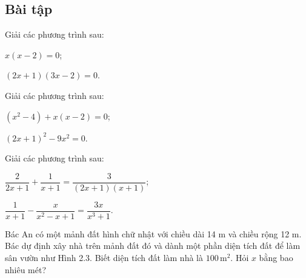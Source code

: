 \begin{exercises}
    \subsection{Bài tập}

    \begin{questions}[series=SGK]
        \item Giải các phương trình sau:
        \begin{questions}
            \item $x(x-2)=0$;

            \answerline
            \answerline
            \item $(2x+1)(3x-2)=0$.

            \answerline
            \answerline
        \end{questions}

        \item Giải các phương trình sau:
        \begin{questions}
            \item $(x^2-4)+x(x-2)=0$;

            \answerline
            \answerline
            \item $(2x+1)^2-9x^2=0$.

            \answerline
            \answerline
        \end{questions}

        \item Giải các phương trình sau:
        \begin{questions}
            \item $\dfrac{2}{2x+1}+\dfrac{1}{x+1}=\dfrac{3}{(2x+1)(x+1)}$;

            \answerline
            \answerline
            \answerline
            \item $\dfrac{1}{x+1}-\dfrac{x}{x^2-x+1}=\dfrac{3x}{x^3+1}$.

            \answerline
            \answerline
            \answerline
        \end{questions}

        \item Bác An có một mảnh đất hình chữ nhật với chiều dài 14 m và chiều rộng 12 m. Bác dự định xây nhà trên mảnh đất đó và dành một phần diện tích đất để làm sân vườn như Hình 2.3. Biết diện tích đất làm nhà là $100\,\mathrm{m}^2$. Hỏi $x$ bằng bao nhiêu mét?


\end{questions}
\end{exercises}
